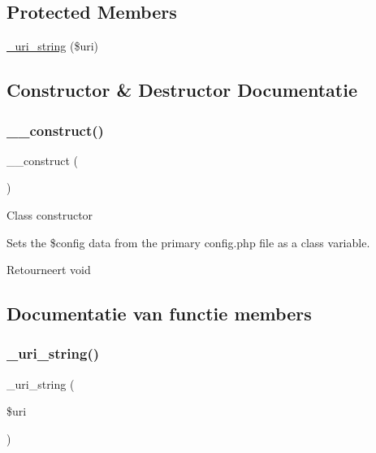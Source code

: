 \subsection*{Protected Members}
\begin{DoxyCompactItemize}
\item 
\mbox{\hyperlink{class_c_i___config_a8a0a35d53f0904d9f655e82804b9998d}{\+\_\+uri\+\_\+string}} (\$uri)
\end{DoxyCompactItemize}


\subsection{Constructor \& Destructor Documentatie}
\mbox{\label{class_c_i___config_a095c5d389db211932136b53f25f39685}} 
\subsubsection{\texorpdfstring{\_\_construct()}{\_\_construct()}}
{\footnotesize\ttfamily \+\_\+\+\_\+construct (\begin{DoxyParamCaption}{ }\end{DoxyParamCaption})}

Class constructor

Sets the \$config data from the primary config.\+php file as a class variable.

\begin{DoxyReturn}{Retourneert}
void 
\end{DoxyReturn}


\subsection{Documentatie van functie members}
\mbox{\label{class_c_i___config_a8a0a35d53f0904d9f655e82804b9998d}} 
\subsubsection{\texorpdfstring{\_uri\_string()}{\_uri\_string()}}
{\footnotesize\ttfamily \+\_\+uri\+\_\+string (\begin{DoxyParamCaption}\item[{}]{\$uri }\end{DoxyParamCaption})\hspace{0.3cm}{\ttfamily [protected]}}

